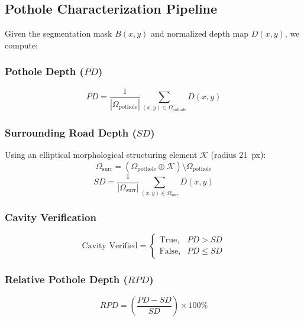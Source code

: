 \documentclass[conference]{IEEEtran}
\begin{document}
\subsection{Pothole Characterization Pipeline}
\label{sec:characterization}

Given the segmentation mask $B(x,y)$ and normalized depth map $D(x,y)$, we compute:

\subsubsection{Pothole Depth ($PD$)}
\begin{equation}
PD = \frac{1}{|\Omega_{\text{pothole}}|} \sum_{(x,y) \in \Omega_{\text{pothole}}} D(x,y)
\label{eq:pd}
\end{equation}

\subsubsection{Surrounding Road Depth ($SD$)}
Using an elliptical morphological structuring element $\mathcal{K}$ (radius 21~px):
\begin{equation}
\Omega_{\text{surr}} = (\Omega_{\text{pothole}} \oplus \mathcal{K}) \setminus \Omega_{\text{pothole}}
\end{equation}
\begin{equation}
SD = \frac{1}{|\Omega_{\text{surr}}|} \sum_{(x,y) \in \Omega_{\text{surr}}} D(x,y)
\label{eq:sd}
\end{equation}

\subsubsection{Cavity Verification}
\begin{equation}
\text{Cavity Verified} = \begin{cases} \text{True}, & PD > SD \\ \text{False}, & PD \leq SD \end{cases}
\end{equation}

\subsubsection{Relative Pothole Depth ($RPD$)}
\begin{equation}
RPD = \left(\frac{PD - SD}{SD}\right) \times 100\%
\label{eq:rpd}
\end{equation}
\end{document}
